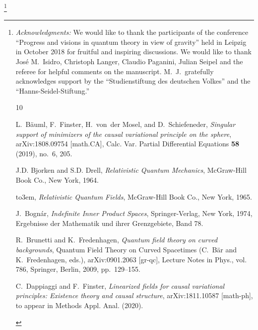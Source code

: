 \documentclass[reqno,11pt]{amsart}
\numberwithin{equation}{section}
\newcommand{\Thanks}{\vspace*{.5em} \noindent \thanks}
\newcommand{\1}{\mbox{\rm 1 \hspace{-1.05 em} 1}}
\begin{document}

\Thanks{{{\em{Acknowledgments:}} We would like to thank the participants of the
conference ``Progress and visions in quantum theory in view of gravity'' held in Leipzig in October 2018
for fruitful and inspiring discussions. We would like to thank Jos{\'e} M.\ Isidro, Christoph Langer,
Claudio Paganini, Julian Seipel and the referee for helpful comments on the manuscript.
M.~J.\ gratefully acknowledges support by the ``Studienstiftung des deutschen Volkes'' and the ``Hanns-Seidel-Stiftung.''

%
%
\providecommand{\bysame}{\leavevmode\hbox to3em{\hrulefill}\thinspace}
\providecommand{\MR}{\relax\ifhmode\unskip\space\fi MR }
\providecommand{\MRhref}[2]{%
  \href{http://www.ams.org/mathscinet-getitem?mr=#1}{#2}
}
\providecommand{\href}[2]{#2}
\begin{thebibliography}{10}

L.~B\"auml, F.~Finster, H.~von~der Mosel, and D.~Schiefeneder, \emph{Singular
  support of minimizers of the causal variational principle on the sphere},
  arXiv:1808.09754 [math.CA], Calc. Var. Partial Differential Equations
  \textbf{58} (2019), no.~6, 205.

J.D. Bjorken and S.D. Drell, \emph{Relativistic {Q}uantum {M}echanics},
  McGraw-Hill Book Co., New York, 1964.

\bysame, \emph{Relativistic {Q}uantum {F}ields}, McGraw-Hill Book Co., New
  York, 1965.

J.~Bogn{\'a}r, \emph{Indefinite {I}nner {P}roduct {S}paces}, Springer-Verlag,
  New York, 1974, Ergebnisse der Ma\-the\-matik und ihrer Grenzgebiete, Band
  78.

R.~Brunetti and K.~Fredenhagen, \emph{Quantum field theory on curved
  backgrounds}, Quantum {F}ield {T}heory on {C}urved {S}pacetimes (C.~B\"ar and
  K.~Fredenhagen, eds.), arXiv:0901.2063 [gr-qc], Lecture Notes in Phys., vol.
  786, Springer, Berlin, 2009, pp.~129--155.

C.~Dappiaggi and F.~Finster, \emph{Linearized fields for causal variational
  principles: {E}xistence theory and causal structure}, arXiv:1811.10587
  [math-ph], to appear in Methods Appl. Anal. (2020).


\end{thebibliography}}}
\end{document}

